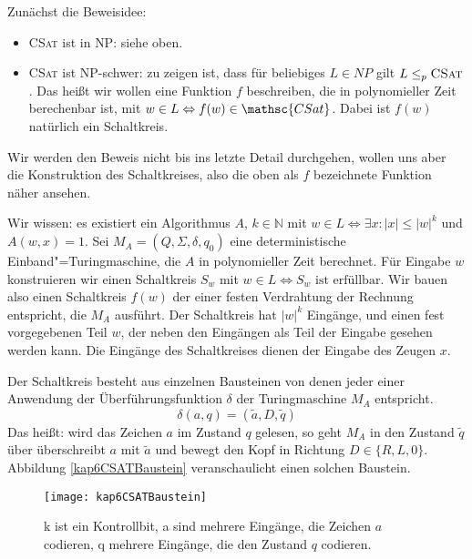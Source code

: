 \begin{Bew}
  \hspace{\parindent}Zunächst die Beweisidee:
  
  \begin{itemize}
    \item \textsc{CSat} ist in \textsf{NP}: siehe oben.
    \item \textsc{CSat} ist \textsf{NP}-schwer: zu zeigen ist, dass für beliebiges $L \in NP$ gilt $L \le_p \text{\textsc{CSat}}$. Das heißt wir wollen eine Funktion $f$ beschreiben, die in polynomieller Zeit berechenbar ist, mit $w \in L \Leftrightarrow f(w) \in \mathsc{CSat}$. Dabei ist $f(w)$ natürlich ein Schaltkreis.
  \end{itemize}
  
  Wir werden den Beweis nicht bis ins letzte Detail durchgehen, wollen uns aber die Konstruktion des Schaltkreises, also die oben als $f$ bezeichnete Funktion näher ansehen.
  
  Wir wissen: es existiert ein Algorithmus $A$, $k \in \mathbb{N}$ mit $w \in L \Leftrightarrow \exists x : |x| \le |w|^k$ und $A(w,x) = 1$. Sei $M_A=(Q, \Sigma, \delta, q_0)$ eine deterministische Einband"=Turingmaschine, die $A$ in polynomieller Zeit berechnet. Für Eingabe $w$ konstruieren wir einen Schaltkreis $S_w$ mit $w \in L \Leftrightarrow S_w \text{ ist erfüllbar}$. Wir bauen also einen Schaltkreis $f(w)$ der einer festen Verdrahtung der Rechnung entspricht, die $M_A$ ausführt. Der Schaltkreis hat $|w|^k$ Eingänge, und einen fest vorgegebenen Teil $w$, der neben den Eingängen als Teil der Eingabe gesehen werden kann. Die Eingänge des Schaltkreises dienen der Eingabe des Zeugen $x$.
  
  Der Schaltkreis besteht aus einzelnen Bausteinen von denen jeder einer Anwendung der Überführungsfunktion $\delta$ der Turingmaschine $M_A$ entspricht.
  \[ \delta(a,q) = (\tilde{a}, D, \tilde{q}) \]
  Das heißt: wird das Zeichen $a$ im Zustand $q$ gelesen, so geht $M_A$ in den Zustand $\tilde{q}$ über überschreibt $a$ mit $\tilde{a}$ und bewegt den Kopf in Richtung $D \in \{R, L, 0\}$. Abbildung \vref{kap6CSATBaustein} veranschaulicht einen solchen Baustein.
  
  \begin{figure}[htb]
    \centering
    \texttt{[image: kap6CSATBaustein]}
    \caption{k ist ein Kontrollbit, a sind mehrere Eingänge, die Zeichen $a$ codieren, q mehrere Eingänge, die den Zustand $q$ codieren.}
    \label{kap6CSATBaustein}
  \end{figure}


\end{Bew}
